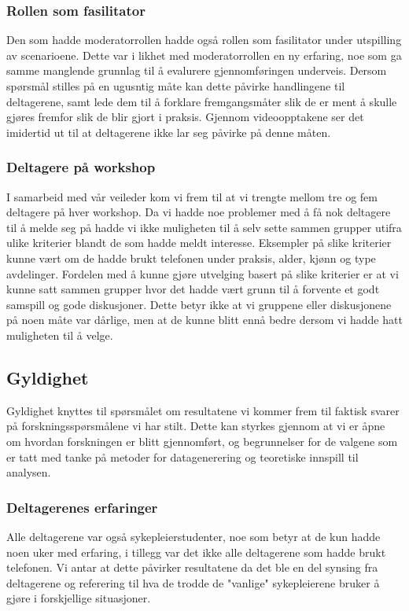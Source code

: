 \subsubsection{Rollen som fasilitator}
Den som hadde moderatorrollen hadde også rollen som fasilitator under utspilling av scenarioene. Dette var  i likhet med moderatorrollen en ny erfaring, noe som ga samme manglende grunnlag til å evalurere gjennomføringen underveis. Dersom spørsmål stilles på en ugusntig måte kan dette påvirke handlingene til deltagerene, samt lede dem til å forklare fremgangsmåter slik de er ment å skulle gjøres fremfor slik de blir gjort i praksis. Gjennom videoopptakene ser det imidertid ut til at deltagerene ikke lar seg påvirke på denne måten.

\subsubsection{Deltagere på workshop}
I samarbeid med vår veileder kom vi frem til at vi trengte mellom tre og fem deltagere på hver workshop. Da vi hadde noe problemer med å få nok deltagere til å melde seg på hadde vi ikke muligheten til å selv sette sammen grupper utifra ulike kriterier blandt de som hadde meldt interesse. Eksempler på slike kriterier kunne vært om de hadde brukt telefonen under praksis, alder, kjønn og type avdelinger. Fordelen med å kunne gjøre utvelging basert på slike kriterier er at vi kunne satt sammen grupper hvor det hadde vært grunn til å forvente et godt samspill og gode diskusjoner. Dette betyr ikke at vi gruppene eller diskusjonene på noen måte var dårlige, men at de kunne blitt ennå bedre dersom vi hadde hatt muligheten til å velge.

\subsection{Gyldighet}
Gyldighet knyttes til spørsmålet om resultatene vi kommer frem til faktisk svarer på forskningsspørsmålene vi har stilt. Dette kan styrkes gjennom at vi er åpne om hvordan forskningen er blitt gjennomført, og begrunnelser for de valgene som er tatt med tanke på metoder for datagenerering og teoretiske innspill til analysen. 

\subsubsection{Deltagerenes erfaringer}
Alle deltagerene var også sykepleierstudenter, noe som betyr at de kun hadde noen uker med erfaring, i tillegg var det ikke alle deltagerene som hadde brukt telefonen. Vi antar at dette påvirker resultatene da det ble en del synsing fra deltagerene og referering til hva de trodde de "vanlige" sykepleierene bruker å gjøre i forskjellige situasjoner.  


